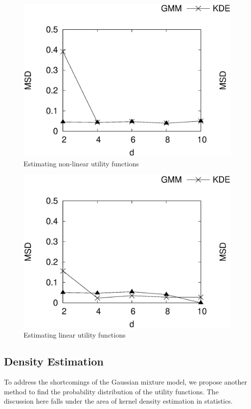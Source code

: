 \begin{figure}[ht]
	\includegraphics[width=1\textwidth]{data.eps}
	\caption{Estimating non-linear utility functions}
\end{figure}
\begin{figure}[ht]
	\includegraphics[width=1\textwidth]{data2.eps}
	\caption{Estimating linear utility functions}
\end{figure}
\subsection{Density Estimation}
To address the shortcomings of the Gaussian mixture model, we propose another method to find the probability distribution of the utility functions. The discussion here falls under the area of kernel density estimation in statistics. 

